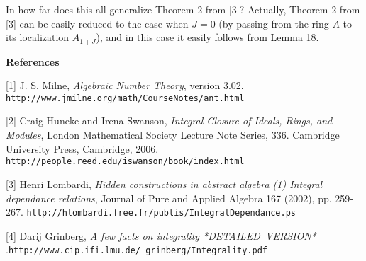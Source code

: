 \documentclass[12pt,final,notitlepage,onecolumn]{article}%
\begin{document}
In how far does this all generalize Theorem 2 from [3]? Actually, Theorem 2
from [3] can be easily reduced to the case when $J=0$ (by passing from the
ring $A$ to its localization $A_{1+J}$), and in this case it easily follows
from Lemma 18.

\begin{center}
\color{blue} \textbf{References} \color{black}
\end{center}

[1] J. S. Milne, \textit{Algebraic Number Theory}, version 3.02.\newline%
\texttt{http://www.jmilne.org/math/CourseNotes/ant.html}

[2] Craig Huneke and Irena Swanson, \textit{Integral Closure of Ideals, Rings,
and Modules}, London Mathematical Society Lecture Note Series, 336. Cambridge
University Press, Cambridge, 2006.\newline%
\texttt{http://people.reed.edu/iswanson/book/index.html}

[3] Henri Lombardi, \textit{Hidden constructions in abstract algebra (1)
Integral dependance relations}, Journal of Pure and Applied Algebra 167
(2002), pp. 259-267.\newline%
\texttt{http://hlombardi.free.fr/publis/IntegralDependance.ps}

[4] Darij Grinberg, \textit{A few facts on integrality *DETAILED\ VERSION*}%
.\newline\texttt{http://www.cip.ifi.lmu.de/%
grinberg/Integrality.pdf}
\end{document}
